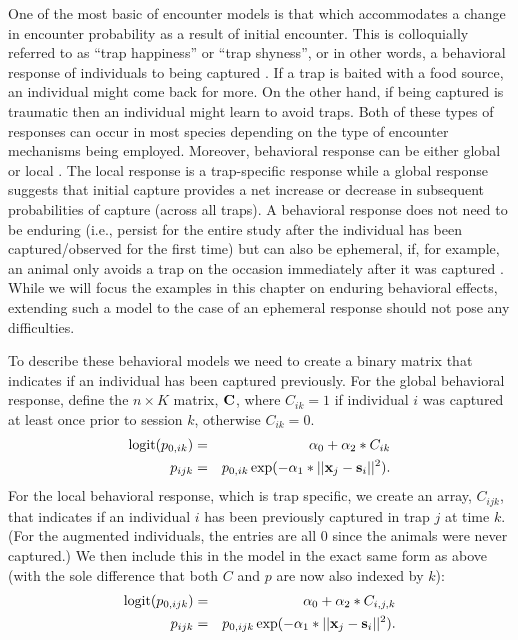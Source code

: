 One of the most basic of encounter models is that which accommodates a
change in encounter probability as a result of initial encounter.
This is colloquially referred to as ``trap happiness'' or ``trap
shyness'', or in other words, a behavioral response of individuals to
being captured \citep{otis_etal:1978}.  If a trap is baited with a
food source, an individual might come back for more. On the other
hand, if being captured is traumatic then an individual might learn to
avoid traps. Both of these types of responses can occur in most
species depending on the type of encounter mechanisms being
employed. Moreover, behavioral response can be either global
\citep{gardner_etal:2010jwm} or local \citep{royle_etal:2011jwm}.  The
local response is a trap-specific response while a global response
suggests that initial capture provides a net increase or decrease in
subsequent probabilities of capture (across all traps). A behavioral
response does not need to be enduring (i.e., persist for the entire
study after the individual has been captured/observed for the first
time) but can also be ephemeral, if, for example, an animal only
avoids a trap on the occasion immediately after it was captured
\citep{yang_chao:2005, royle:2008}. While we will focus the examples
in this chapter on enduring behavioral effects, extending such a model
to the case of an ephemeral response should not pose any difficulties.

To describe these behavioral models we need to create a binary matrix that indicates
if an individual has been captured previously.  For the global
behavioral response, define the $n \times K$ matrix,
${\bf C}$, where $C_{ik} =1$
if individual $i$ was captured at least once prior to session
$k$, otherwise $C_{ik} = 0$.
\begin{eqnarray*}
\mbox{logit}(p_{0,ik})& =& \alpha_{0} + \alpha_{2}*C_{ik} \\
p_{ijk} &= &p_{0,ik} \exp(- \alpha_{1}*||{\bf x}_{j}-{\bf s}_{i}||^2).
\end{eqnarray*}
For the local behavioral response, which is trap specific, we create
an array, $C_{ijk}$, that indicates if an individual $i$ has been
previously captured in trap $j$ at time $k$. (For the augmented individuals, the entries
are all 0 since the animals were never captured.)  We then include this in
the model in the exact same form as above (with the sole difference that both $C$ and $p$ 
are now also indexed by $k$):
\begin{eqnarray*}
\mbox{logit}(p_{0,ijk}) &= &\alpha_{0} + \alpha_{2}*C_{i,j,k} \\
          p_{ijk} &= &  p_{0,ijk} \exp(- \alpha_{1}*||{\bf x}_{j}-{\bf s}_{i}||^2).
\end{eqnarray*}

